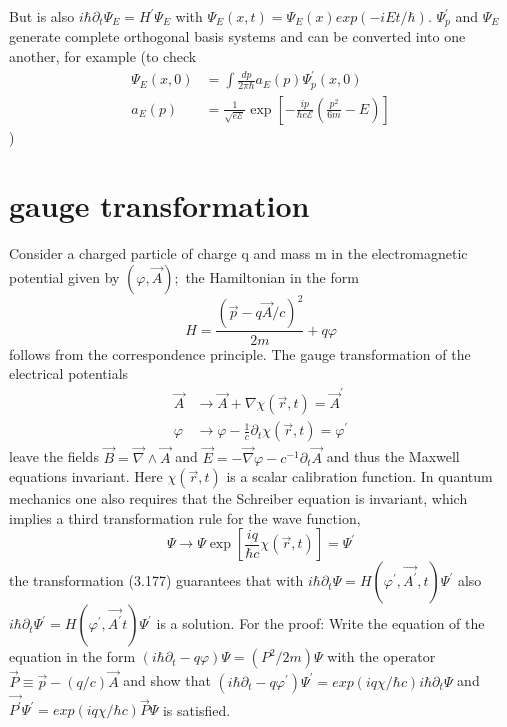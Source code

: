But is also $i \hbar\partial_t\Psi_E = H^{\prime}\Psi_E$ with $\Psi_E(x, t) = \Psi_E(x) exp (-iEt / \hbar)$. $\Psi_p^{\prime}$ and $\Psi_E$ generate complete orthogonal basis systems and can be converted into one another, for example (to check
\begin{equation}
\begin{aligned} \Psi_{E}(x, 0) &=\int \frac{d p}{2 \pi \hbar} a_{E}(p) \Psi_{p}^{\prime}(x, 0) \\ a_{E}(p) &=\frac{1}{\sqrt{e \mathcal{E}}} \exp \left[-\frac{i p}{\hbar e \mathcal{E}}\left(\frac{p^{2}}{6 m}-E\right)\right] \end{aligned}
\end{equation}
)
\section{gauge transformation}
Consider a charged particle of charge q and mass m in the electromagnetic potential given by $(\varphi, \vec{A});$ the Hamiltonian in the form
\begin{equation}
    H=\frac{(\vec{p}-q \vec{A} / c)^{2}}{2 m}+q \varphi
    \end{equation}
follows from the correspondence principle. The gauge transformation of the electrical potentials
\begin{equation}
\begin{aligned} \vec{A} & \rightarrow \vec{A}+\nabla \chi(\vec{r}, t)=\vec{A}^{\prime} \\ \varphi & \rightarrow \varphi-\frac{1}{c} \partial_{t} \chi(\vec{r}, t)=\varphi^{\prime} \end{aligned}
\end{equation}
leave the fields $\vec{B} = \vec{\nabla} \wedge \vec{A} $ and $\vec{E}= -\vec{\nabla}\varphi - c^{-1}\partial_t\vec{A}$ and thus the Maxwell equations invariant. Here $\chi (\vec{r} , t)$ is a scalar calibration function. In quantum mechanics one also requires that the Schreiber equation is invariant, which implies a third transformation rule for the wave function,
\begin{equation}
    \Psi \rightarrow \Psi \exp \left[\frac{i q}{\hbar c} \chi(\vec{r}, t)\right]=\Psi^{\prime}
    \end{equation}
the transformation (3.177) guarantees that with $i \hbar \partial_t\Psi = H (\varphi^{\prime}, \vec{A^{\prime}}, t ) \Psi^{\prime}$ also
$i \hbar \partial_t\Psi^{\prime} = H (\varphi^{\prime},\vec{A^{\prime}} t) \Psi^{\prime} $ is a solution. For the proof: Write the equation of the equation in the form $(i \hbar\partial_t - q\varphi) \Psi = (P^2 / 2m) \Psi$ with the operator $\vec{P} \equiv \vec{p} - (q / c) \vec{A}$ and show that $(i \hbar\partial_t - q\varphi^{\prime}) \Psi^{\prime} = exp (iq\chi / \hbar c) i \hbar\partial_t\Psi$ and $\vec{P^{\prime}}\Psi^{\prime} = exp (iq\chi / \hbar c) \vec{P} \Psi$ is satisfied.
